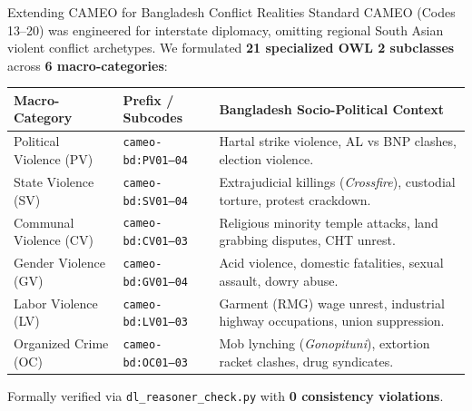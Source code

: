 \documentclass[aspectratio=169, 10pt]{beamer}
\begin{document}
\begin{frame}{Extending CAMEO for Bangladesh Conflict Realities}
  \small
  Standard CAMEO (Codes 13--20) was engineered for interstate diplomacy, omitting regional South Asian violent conflict archetypes. We formulated \textbf{21 specialized OWL 2 subclasses} across \textbf{6 macro-categories}:
  \vspace{0.4em}
  \begin{table}[h]
    \centering
    \footnotesize
    \begin{tabularx}{\textwidth}{llX}
      \toprule
      \textbf{Macro-Category} & \textbf{Prefix / Subcodes} & \textbf{Bangladesh Socio-Political Context} \\
      \midrule
      Political Violence (PV) & \texttt{cameo-bd:PV01--04} & Hartal strike violence, AL vs BNP clashes, election violence. \\
      State Violence (SV)     & \texttt{cameo-bd:SV01--04} & Extrajudicial killings (\textit{Crossfire}), custodial torture, protest crackdown. \\
      Communal Violence (CV)  & \texttt{cameo-bd:CV01--03} & Religious minority temple attacks, land grabbing disputes, CHT unrest. \\
      Gender Violence (GV)    & \texttt{cameo-bd:GV01--04} & Acid violence, domestic fatalities, sexual assault, dowry abuse. \\
      Labor Violence (LV)     & \texttt{cameo-bd:LV01--03} & Garment (RMG) wage unrest, industrial highway occupations, union suppression. \\
      Organized Crime (OC)    & \texttt{cameo-bd:OC01--03} & Mob lynching (\textit{Gonopituni}), extortion racket clashes, drug syndicates. \\
      \bottomrule
    \end{tabularx}
  \end{table}
  \vspace{0.2em}
  Formally verified via \texttt{dl\_reasoner\_check.py} with \textbf{0 consistency violations}.
\end{frame}
\end{document}
